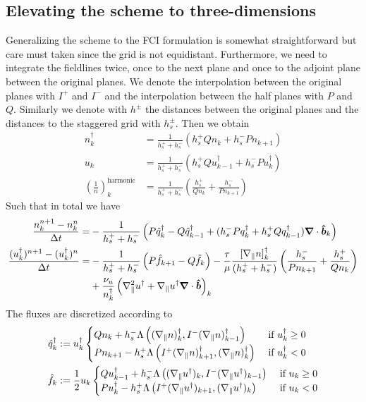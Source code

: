 \subsection{Elevating the scheme to three-dimensions}
Generalizing the scheme to the FCI formulation is somewhat straightforward
but care must taken since the grid is not equidistant.
Furthermore, we need to integrate the fieldlines twice, once to the next plane
and once to the adjoint plane between the original planes.
We denote the interpolation between the original planes with $I^+$ and $I^-$ and
the interpolation between the half planes with $P$ and $Q$. Similarly
we denote with $h^\pm$ the distances between the original planes and the distances
to the staggered grid with $h_s^\pm$.
Then we obtain
\begin{align}
n_k^\dagger &= \frac{1}{h_s^+ + h_s^-}\left( h_s^+ Qn_k + h_s^- Pn_{k+1}\right) \\
u_k &= \frac{1}{h_s^+ + h_s^-}\left( h_s^+ Qu^\dagger_{k-1} + h_s^- Pu_{k}^\dagger\right) \\
\left(\frac{1}{n}\right)_k^\text{harmonic} &= \frac{1}{h_s^+ + h_s^-}\left( \frac{h_s^+}{Qn_k} + \frac{h_s^-}{Pn_{k+1}}\right)
\end{align}
Such that in total we have
\begin{align}
    \frac{n_k^{n+1} - n_k^n}{\Delta t} = &-\frac{1}{h_s^+ + h_s^-}\left( P\hat
q_k^\dagger - Q\hat q_{k-1}^\dagger  + (h_s^- P q_k^\dagger + h_s^+Q
q_{k-1}^\dagger){\boldsymbol{\nabla}}\cdot \bm{\hat{b}}_k \right)
     \\
    \frac{(u_k^\dagger)^{n+1}-(u_k^\dagger)^{n}}{\Delta t} = &-
 \frac{1}{h_s^+ + h_s^-}\left( P\hat f_{k+1} - Q\hat f_k\right)
 -\frac{\tau}{\mu} \frac{[\nabla_\parallel n]^\dagger_k}{(h_s^+ + h_s^-)}\left( \frac{h_s^-}{Pn_{k+1}} + \frac{h_s^+}{Qn_k} \right)
    \nonumber\\
    &+ \frac{\nu_u}{n^\dagger_k }
    \left(\nabla_\parallel^2 u^\dagger + \nabla_\parallel u^\dagger {\boldsymbol{\nabla}}\cdot \bm{\hat{b}}\right)_k
\end{align}
The fluxes are discretized according to
\begin{align}
    \hat q^\dagger_k &:= u^\dagger_k \begin{cases}
        Qn_k     + h_s^-\Lambda\left( (\nabla_\parallel n)^\dagger_k, I^- (\nabla_\parallel n)^\dagger_{k-1}\right)&\text{ if } u^\dagger_k \geq 0 \\
        Pn_{k+1} - h_s^+\Lambda\left( I^+(\nabla_\parallel n)^\dagger_{k+1}, (\nabla_\parallel n)^\dagger_k\right) &\text{ if } u^\dagger_k < 0
    \end{cases}
    \\
    \hat f_k &:= \frac{1}{2}u_k\begin{cases}
        Qu^\dagger_{k-1} + h_s^-\Lambda\left( (\nabla_\parallel u^\dagger )_k, I^- (\nabla_\parallel u^\dagger)_{k-1}\right)&\text{ if } u_k \geq 0 \\
        Pu^\dagger_{k}   - h_s^+\Lambda\left( I^+(\nabla_\parallel u^\dagger)_{k+1}, (\nabla_\parallel u^\dagger)_k\right) &\text{ if } u_k < 0 \\
    \end{cases}
\end{align}
